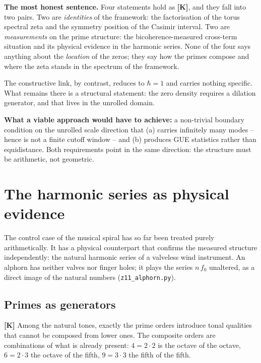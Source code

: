 \textbf{The most honest sentence.} Four statements hold as
\textbf{[K]}, and they fall into two pairs. Two are \emph{identities} of
the framework: the factorisation of the torus spectral zeta and the
symmetry position of the Casimir interval. Two are \emph{measurements}
on the prime structure: the bicoherence-measured cross-term situation
and its physical evidence in the harmonic series. None of the four says
anything about the \emph{location} of the zeros; they say how the primes
compose and where the zeta stands in the spectrum of the framework.

The constructive link, by contrast, reduces to $\hbar = 1$ and carries
nothing specific. What remains there is a structural statement: the zero
density requires a dilation generator, and that lives in the unrolled
domain.

\textbf{What a viable approach would have to achieve:} a non-trivial
boundary condition on the unrolled scale direction that (a) carries
infinitely many modes -- hence is not a finite cutoff window -- and
(b) produces GUE statistics rather than equidistance. Both requirements
point in the same direction: the structure must be arithmetic, not
geometric.

\section{The harmonic series as physical evidence}
\label{sec:alphorn}

The control case of the musical spiral has so far been treated purely
arithmetically. It has a physical counterpart that confirms the
measured structure independently: the natural harmonic series of a
valveless wind instrument. An alphorn has neither valves nor finger
holes; it plays the series $n\,f_0$ unaltered, as a direct image of the
natural numbers (\texttt{z11\_alphorn.py}).

\subsection{Primes as generators}

\textbf{[K]} Among the natural tones, exactly the prime orders
introduce tonal qualities that cannot be composed from lower ones. The
composite orders are combinations of what is already present:
$4 = 2\cdot2$ is the octave of the octave, $6 = 2\cdot3$ the octave of
the fifth, $9 = 3\cdot3$ the fifth of the fifth.

